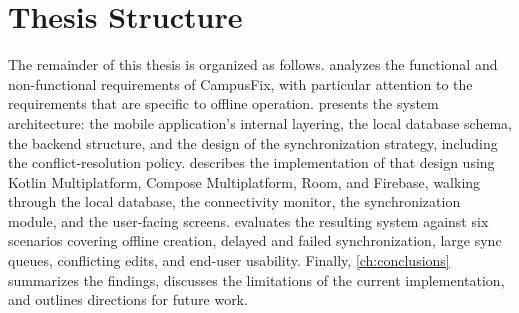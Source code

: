 \section{Thesis Structure}
\label{sec:structure}

The remainder of this thesis is organized as follows.
 analyzes the functional and non-functional
requirements of CampusFix, with particular attention to the requirements
that are specific to offline operation.  presents the
system architecture: the mobile application's internal layering, the local
database schema, the backend structure, and the design of the
synchronization strategy, including the conflict-resolution policy.
 describes the implementation of that design using
Kotlin Multiplatform, Compose Multiplatform, Room, and Firebase, walking
through the local database, the connectivity monitor, the synchronization
module, and the user-facing screens.  evaluates the
resulting system against six scenarios covering offline creation, delayed
and failed synchronization, large sync queues, conflicting edits, and
end-user usability. Finally, \cref{ch:conclusions} summarizes the findings,
discusses the limitations of the current implementation, and outlines
directions for future work.
